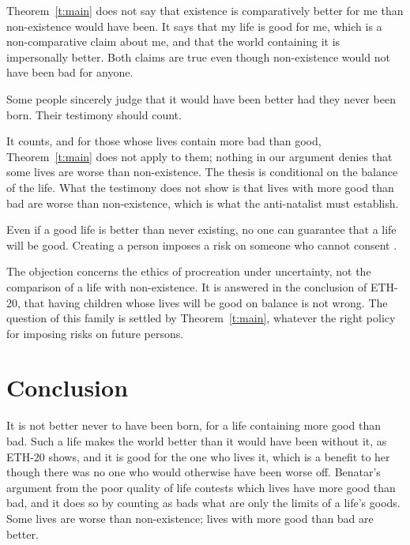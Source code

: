 \documentclass{situationist-preprint}
\begin{document}
\begin{reply}
Theorem~\ref{t:main} does not say that existence is comparatively better for me than non-existence would have been. It says that my life is good for me, which is a non-comparative claim about me, and that the world containing it is impersonally better. Both claims are true even though non-existence would not have been bad for anyone.
\end{reply}

\begin{objection}\label{o:test}
Some people sincerely judge that it would have been better had they never been born. Their testimony should count.
\end{objection}

\begin{reply}
It counts, and for those whose lives contain more bad than good, Theorem~\ref{t:main} does not apply to them; nothing in our argument denies that some lives are worse than non-existence. The thesis is conditional on the balance of the life. What the testimony does not show is that lives with more good than bad are worse than non-existence, which is what the anti-natalist must establish.
\end{reply}

\begin{objection}[Risk]\label{o:risk}
Even if a good life is better than never existing, no one can guarantee that a life will be good. Creating a person imposes a risk on someone who cannot consent \citep{Benatar2006}.
\end{objection}

\begin{reply}
The objection concerns the ethics of procreation under uncertainty, not the comparison of a life with non-existence. It is answered in the conclusion of ETH-20, that having children whose lives will be good on balance is not wrong. The question of this family is settled by Theorem~\ref{t:main}, whatever the right policy for imposing risks on future persons.
\end{reply}

\section{Conclusion}

It is not better never to have been born, for a life containing more good than bad. Such a life makes the world better than it would have been without it, as ETH-20 shows, and it is good for the one who lives it, which is a benefit to her though there was no one who would otherwise have been worse off. Benatar's argument from the poor quality of life contests which lives have more good than bad, and it does so by counting as bads what are only the limits of a life's goods. Some lives are worse than non-existence; lives with more good than bad are better.
\end{document}
